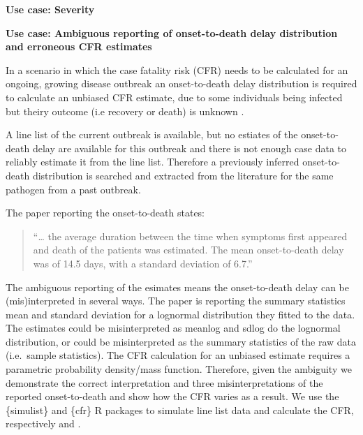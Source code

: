 \documentclass[
  10pt,
  letterpaper,
]{article}
\begin{document}
\begin{tcolorbox}[enhanced jigsaw, breakable, rightrule=.15mm, leftrule=.75mm, left=2mm, colframe=quarto-callout-tip-color-frame, toprule=.15mm, bottomrule=.15mm, opacityback=0, colback=white, arc=.35mm]

\vspace{-3mm}\textbf{Use case: Severity}\vspace{3mm}

\textbf{Use case: Ambiguous reporting of onset-to-death delay
distribution and erroneous CFR estimates}

In a scenario in which the case fatality risk (CFR) needs to be
calculated for an ongoing, growing disease outbreak an onset-to-death
delay distribution is required to calculate an unbiased CFR estimate,
due to some individuals being infected but theiry outcome (i.e recovery
or death) is unknown \citet{nishiuraEarlyEpidemiologicalAssessment2009}.

A line list of the current outbreak is available, but no estiates of the
onset-to-death delay are available for this outbreak and there is not
enough case data to reliably estimate it from the line list. Therefore a
previously inferred onset-to-death distribution is searched and
extracted from the literature for the same pathogen from a past
outbreak.

The paper reporting the onset-to-death states:

\begin{quote}
``\ldots{} the average duration between the time when symptoms first
appeared and death of the patients was estimated. The mean
onset-to-death delay was of 14.5 days, with a standard deviation of
6.7.''
\end{quote}

The ambiguous reporting of the esimates means the onset-to-death delay
can be (mis)interpreted in several ways. The paper is reporting the
summary statistics mean and standard deviation for a lognormal
distribution they fitted to the data. The estimates could be
misinterpreted as meanlog and sdlog do the lognormal distribution, or
could be misinterpreted as the summary statistics of the raw data
(i.e.~sample statistics). The CFR calculation for an unbiased estimate
requires a parametric probability density/mass function. Therefore,
given the ambiguity we demonstrate the correct interpretation and three
misinterpretations of the reported onset-to-death and show how the CFR
varies as a result. We use the \{simulist\} and \{cfr\} R packages to
simulate line list data and calculate the CFR, respectively
\citet{lambertSimulistSimulateDisease2024} and
\citet{gupteCfrEstimateDisease2024}.


\end{tcolorbox}
\end{document}
